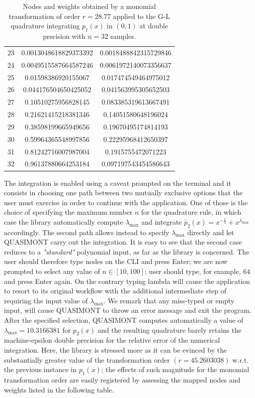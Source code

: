 \documentclass[a4paper, twosided]{book}
\begin{document}
\begin{table}[H]
\begin{tabular}{|c||c|c|}
23  &  0.0013048618829373392   &  0.0018488842315729846   \\
24  &  0.0049515587664587246   &  0.0061972140073356637   \\
25  &  0.01598386920155067     &  0.017474549464975012    \\
26  &  0.044176504650425052    &  0.041563995305652503    \\
27  &  0.10510275956828145     &  0.083385319613667491    \\
28  &  0.21621415218381346     &  0.14051580648196024     \\
29  &  0.38598199665949656     &  0.19670495174814193     \\
30  &  0.59964365548997856     &  0.22295968412650397     \\
31  &  0.81242716007987004     &  0.1915755472071223      \\
32  &  0.96137880664253184     &  0.097197543454586643    \\
\hline
\end{tabular}
  \caption{Nodes and weights obtained by a monomial transformation of order $r=28.77$ applied to the G-L quadrature integrating $p_1(x)$ in $(0,1)$ at double precision with $n=32$ samples.}
  \label{table2.1}
\end{table}

\noindent
The integration is enabled using a caveat prompted on the terminal and it consists in choosing one path between two mutually exclusive options that the user must exercise in order to continue with the application. One of those is the choice of specifying the maximum number $n$ for the quadrature rule, in which case the library  automatically compute $\lambda_{\text{max}}$ and integrate $\tilde{p_2}(x) = x^{-\frac{e}{3}} + x^{\lambda_\text{max}}$ accordingly. The second path allows instead to specify $\lambda_{\text{max}}$ directly and let QUASIMONT carry out the integration. It is easy to see that the second case reduces to a \textsl{"standard"} polynomial input, as far as the library is concerned. The user should therefore type \colorbox{poliGrayBlue}{nodes} on the CLI and press Enter; we are now prompted to select any value of $n\in[10,100]$; user should type, for example, $64$ and press Enter again. On the contrary typing \colorbox{poliGrayBlue}{lambda} will cause the application to resort to its original workflow with the additional intermediate step of requiring the input value of $\lambda_{\text{max}}$. We remark that any miss-typed or empty input, will cause QUASIMONT to throw an error message and exit the program. After the specified selection, QUASIMONT computes automatically a value of $\lambda_{\text{max}} = 10.3166381$ for $p_2(x)$ and the resulting quadrature barely retains the machine-epsilon double precision for the relative error of the numerical integration. Here, the library is stressed more as it can be evinced by the substantially greater value of the transformation order $(r=45.2603038)$ w.r.t. the previous instance in $p_1(x)$; the effects of such magnitude for the monomial transformation order are easily registered by assessing the mapped nodes and weights listed in the following table.
\end{document}
